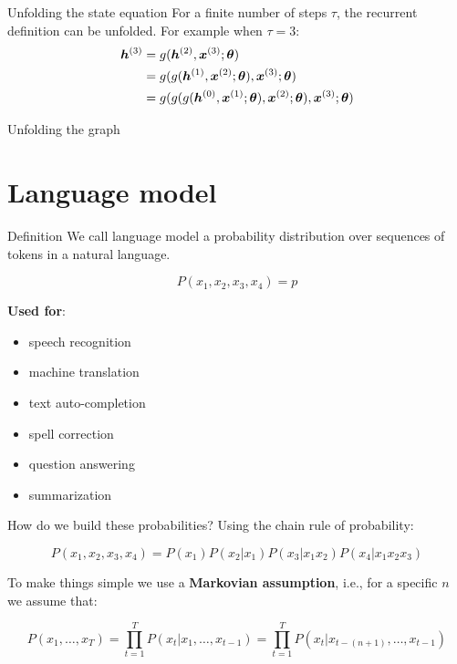 \documentclass[10pt]{beamer}
\begin{document}
\begin{frame}{Unfolding the state equation}
For a finite number of steps $\tau$, the recurrent definition can be unfolded. 
For example when $\tau =3$:
\vspace{0.2cm}
\Large{
\begin{align*}
\bm{h}^{(3)}& = g(\bm{h}^{(2)}, \bm{x}^{(3)}; \bm{\theta})\\
 & = g(g(\bm{h}^{(1)}, \bm{x}^{(2)}; \bm{\theta}), \bm{x}^{(3)}; \bm{\theta})\\
 & = g(g(g(\bm{h}^{(0)}, \bm{x}^{(1)}; \bm{\theta}), \bm{x}^{(2)}; \bm{\theta}), \bm{x}^{(3)}; \bm{\theta})\\
\end{align*}
}
\end{frame}

\begin{frame}{Unfolding the graph}

\end{frame}

\section{Language model}

\begin{frame}{Definition}
We call \alert{language model} a probability distribution over sequences of tokens in a natural language.

\[
P(x_1,x_2,x_3,x_4) = p
\]

\textbf{Used for}:
\begin{itemize}
\item speech recognition
\item machine translation
\item text auto-completion
\item spell correction
\item question answering
\item summarization
\end{itemize}


\end{frame}

\begin{frame}{How do we build these probabilities?}
Using the chain rule of probability: 

\begin{equation*}
P(x_1,x_2,x_3,x_4) = P(x_1)P(x_2\vert x_1)P(x_3\vert x_1x_2)P(x_4\vert x_1x_2x_3)
\end{equation*}

\vspace{0.3cm}

To make things simple we use a \textbf{Markovian assumption}, i.e., for a specific $n$ we assume that:

\begin{equation*}
P(x_1, \dots, x_T) = \prod_{t=1}^{T} P(x_t \vert x_1, \dots, x_{t-1}) = \prod_{t=1}^{T} P(x_{t} \vert x_{t - (n+1)}, \dots, x_{t-1})
\end{equation*}	

\end{frame}
\end{document}
